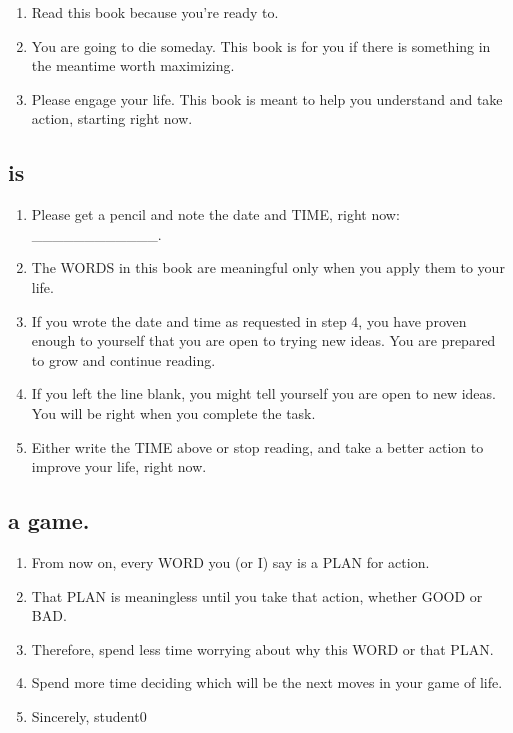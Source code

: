 \documentclass[
]{book}
\providecommand{\tightlist}{%
  \setlength{\itemsep}{0pt}\setlength{\parskip}{0pt}}
\begin{document}
\begin{enumerate}
\def\labelenumi{\arabic{enumi}.}
\tightlist
\item
  Read this book because you're ready to.
\item
  You are going to die someday. This book is for you if there is something in the
  meantime worth maximizing.
\item
  Please engage your life.
  This book is meant to help you understand and take action, starting right now.
\end{enumerate}

\hypertarget{is}{%
\subsection{is}\label{is}}

\begin{enumerate}
\def\labelenumi{\arabic{enumi}.}
\setcounter{enumi}{3}
\tightlist
\item
  Please get a pencil and note the date and TIME, right now: \_\_\_\_\_\_\_\_\_\_\_\_.
\item
  The WORDS in this book are meaningful only when you apply them to your life.
\item
  If you wrote the date and time as requested in step 4, you have proven enough to yourself that you are open to trying
  new ideas. You are prepared to grow and continue reading.
\item
  If you left the line blank, you might tell yourself you are open to new ideas. You
  will be right when you complete the task.
\item
  Either write the TIME above or stop reading, and take a better action to improve
  your life, right now.
\end{enumerate}

\hypertarget{a-game.}{%
\subsection{a game.}\label{a-game.}}

\begin{enumerate}
\def\labelenumi{\arabic{enumi}.}
\setcounter{enumi}{8}
\item
  From now on, every WORD you (or I) say is a PLAN for action.
\item
  That PLAN is meaningless until you take that action, whether GOOD or BAD.
\item
  Therefore, spend less time worrying about why this WORD or that PLAN.
\item
  Spend more time deciding which will be the next moves in your game of life.
\item
  Sincerely, student0
\end{enumerate}
\end{document}

